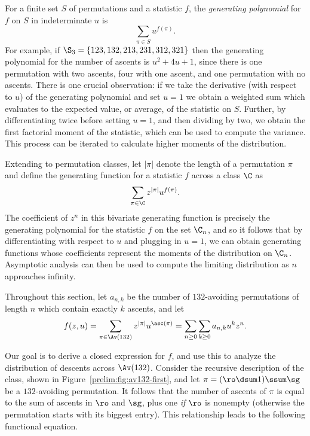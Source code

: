 \documentclass[12pt,twoside]{memoir}
\begin{document}
      For a finite set $S$ of permutations and a statistic $f$, the
      \emph{generating polynomial} for $f$ on $S$ in indeterminate $u$ is 
      $$ \sum_{\pi \in S} u^{f(\pi)}.$$
      For example, if $\S_3 = \{123, 132, 213, 231, 312, 321\}$ then the generating
      polynomial for the number of ascents is $u^2 + 4u + 1$, since there is one
      permutation with two ascents, four with one ascent, and one permutation
      with no ascents. There is one crucial observation: if we take the
      derivative (with respect to $u$) of the generating polynomial and set $u=1$
      we obtain a weighted sum which evaluates to the expected value, or average,
      of the statistic on $S$. Further, by differentiating twice before setting
      $u=1$, and then dividing by two, we obtain the first factorial moment of
      the statistic, which can be used to compute the variance. This process can
      be iterated to calculate higher moments of the distribution. 

      Extending to permutation classes, let $|\pi|$ denote the length of a
      permutation $\pi$ and define the generating function for a statistic $f$
      across a class $\C$ as
      $$ \sum_{\pi \in \C} z^{|\pi|} u^{f(\pi)}.$$
      The coefficient of $z^n$ in this bivariate generating function is precisely
      the generating polynomial for the statistic $f$ on the set $\C_n$, and so
      it follows that by differentiating with respect to $u$ and plugging in
      $u=1$, we can obtain generating functions whose coefficients represent the
      moments of the distribution on $\C_n$. Asymptotic analysis can then be used
      to compute the limiting distribution as $n$ approaches infinity. 



      Throughout this section, let $a_{n,k}$ be the number of $132$-avoiding
      permutations of length $n$ which contain exactly $k$ ascents, and let
      $$f(z,u) = \sum_{\pi \in \Av(132)} z^{|\pi|} u^{\asc(\pi)} = 
                \sum_{n \geq 0} \sum_{k \geq 0} a_{n,k} u^k z^n.$$

      Our goal is to derive a closed expression for $f$, and use this to analyze
      the distribution of descents across $\Av(132)$. Consider the recursive
      description of the class, shown in Figure~\ref{prelim:fig:av132-first}, and
      let $\pi = (\ro \dsum 1) \ssum \sg$ be a $132$-avoiding permutation. It
      follows that the number of ascents of $\pi$ is equal to the sum of ascents
      in $\ro$ and $\sg$, plus one \emph{if} $\ro$ is nonempty (otherwise the
      permutation starts with its biggest entry).
      This relationship leads to the following functional equation. 
\end{document}
